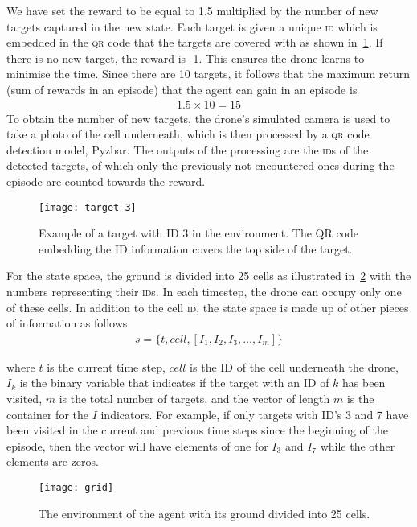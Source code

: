 \documentclass[../main.tex]{subfiles}
\begin{document}
We have set the reward to be equal to 1.5 multiplied by 
the number of new targets captured in the new state.
Each target is given a unique \textsc{id} which 
is embedded in the \textsc{qr} code that the targets are covered with
as shown in~\cref{fig:target}.
If there is no new target, the reward is -1. 
This ensures the drone learns to
minimise the time.
Since there are 10 targets, it follows that the maximum
return (sum of rewards in an episode) that the agent can gain  
in an episode is 
\begin{align}
        1.5 \times 10 = 15
\end{align}
To obtain the number of new targets, the drone's simulated camera is
used to take a photo of the cell
underneath, which is then processed by a \textsc{qr} code detection 
model, Pyzbar. 
The outputs of the processing are the \textsc{id}s of 
the detected targets, 
of which only the previously not encountered ones during 
the episode are counted towards the reward.

\begin{figure}[!t]
	\centering
	\texttt{[image: target-3]}
	\caption{Example of a target with ID 3 in the environment. The QR code
		embedding the ID information covers the top side of the target.}
	\label{fig:target}
\end{figure}

For the state space, the ground is divided into 25 cells as
illustrated in~\cref{fig:grid} with the numbers representing their
\textsc{id}s. 
In each timestep, the drone can occupy only one of these cells.
In addition to the cell \textsc{id}, the state space is made up of
other pieces of information as follows
\begin{align}
	s = \{ t, cell, [ I_1, I_2, I_3, \ldots, I_m] \} 
	\label{eq:state-space}
\end{align}

\noindent 
where $t$ is the current time step, $cell$ is the ID of the
cell underneath the drone, $I_k$ is the binary variable 
that indicates if the target with an ID of $k$ has been
visited, $m$ is the total number of targets,
and the vector of length $m$ is the container for the
$I$ indicators. 
For example,
if only targets with ID's 3 and 7 have been visited
in the current and previous time steps since the beginning of the 
episode,
then the vector will have elements of one for $I_3$ and $I_7$ while
the other elements are zeros.

\begin{figure}[!t]
	\centering
	\texttt{[image: grid]}
	\caption{The environment of the agent with its ground
		divided into 25 cells.}
	\label{fig:grid}
\end{figure}
\end{document}
